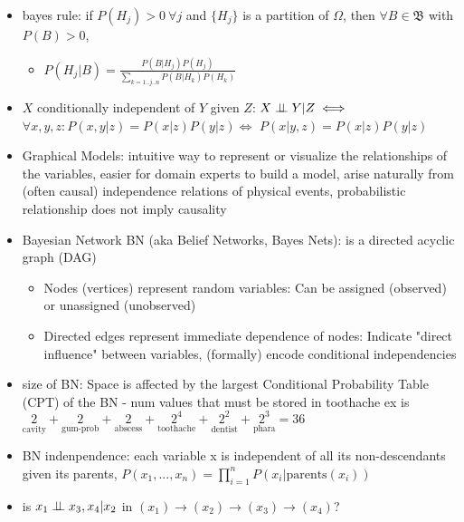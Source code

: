 \documentclass[10pt]{article}
\begin{document}
\begin{itemize}[label=\(\star\), leftmargin=1em, itemsep=-0.3em]
    \item bayes rule: if $P(H_j) > 0\ \forall j$ and $\{H_j\}$ is a partition of $\Omega$, then $\forall B\in \mathfrak{B}$ with $P(B) > 0$,
          \begin{itemize}[label=\(\star\), leftmargin=1em]
              \item[] $P(H_j|B) = \frac{P(B|H_j)P(H_j)}{\sum_{k=1..j..n} P(B|H_k)P(H_k)}$
          \end{itemize}
    \item $X$ conditionally independent of $Y$ given $Z$: $X \perp \!\!\! \perp Y|Z \iff$ $\forall x,y,z: P(x,y|z) = P(x|z)P(y|z) \iff$ $P(x|y,z) = P(x|z)P(y|z)$

    \item Graphical Models: intuitive way to represent or visualize the relationships of the variables, easier for domain experts to build a model, arise naturally from (often causal) independence relations of physical events, probabilistic relationship does not imply causality
    \item Bayesian Network BN (aka Belief Networks, Bayes Nets): is a directed acyclic graph (DAG)

          \begin{itemize}[label=\(\star\), leftmargin=1em, itemsep=-0.3em]
              \item Nodes (vertices) represent random variables: Can be assigned (observed) or unassigned (unobserved)
              \item Directed edges represent immediate dependence of nodes: Indicate "direct influence" between variables, (formally) encode conditional independencies
          \end{itemize}
    \item size of BN: Space is affected by the largest Conditional Probability Table (CPT) of the BN - num values that must be stored in toothache ex is $\underset{\text{cavity}}{2} +\underset{\text{gum-prob}}{2} + \underset{\text{abscess}}{2} + \underset{\text{toothache}}{2^4}+ \underset{\text{dentist}}{2^2} + \underset{\text{phara}}{2^3} = 36$
    \item BN indenpendence: each variable x is independent of all its non-descendants given its parents, $P(x_1, ..., x_n) = \prod_{i=1}^n P(x_i|\text{parents}(x_i))$
    \item is $x_1 \perp \!\!\! \perp x_3,x_4 | x_2$ in $(x_1) \rightarrow (x_2 ) \rightarrow ( x_3)  \rightarrow ( x_4)$?


\end{itemize}
\end{document}
